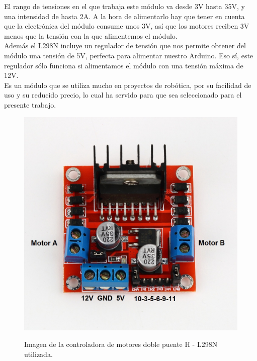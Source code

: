 El rango de tensiones en el que trabaja este módulo va desde 3V hasta 35V, y una intensidad de hasta 2A. A la hora de alimentarlo hay que tener en cuenta que la 
electrónica del módulo consume unos 3V, así que los motores reciben 3V menos que la tensión con la que alimentemos el módulo.\\

Además el L298N incluye un regulador de tensión que nos permite obtener del módulo una tensión de 5V, perfecta para alimentar nuestro Arduino. Eso sí, este regulador sólo 
funciona si alimentamos el módulo con una tensión máxima de 12V.\\

Es un módulo que se utiliza mucho en proyectos de robótica, por su facilidad de uso y su reducido precio, lo cual ha servido para que sea seleccionado para el presente trabajo.

\begin{figure}[H]
  \begin{center}
    \includegraphics[scale=0.8]{imagenes/l298n.jpg}\\
    \caption{ Imagen de la controladora de motores doble puente H - L298N utilizada.}
  \end{center}
\end{figure}



